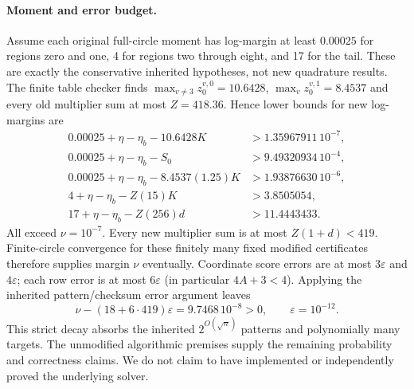 \paragraph{Moment and error budget.}
Assume each original full-circle moment has log-margin at least
$0.00025$ for regions zero and one, 4 for regions two through eight,
and 17 for the tail. These are exactly the conservative inherited
hypotheses, not new quadrature results.
The finite table checker finds
$\max_{v\ne3}z^{v,0}_0=10.6428$,
$\max_v z^{v,1}_0=8.4537$ and every old multiplier sum at most
$Z=418.36$. Hence lower bounds for new log-margins are
\begin{align*}
 0.00025+\eta-\eta_b-10.6428K&>1.35967911\,10^{-7},\\
 0.00025+\eta-\eta_b-S_0&>9.49320934\,10^{-4},\\
 0.00025+\eta-\eta_b-8.4537(1.25)K&>1.93876630\,10^{-6},\\
 4+\eta-\eta_b-Z(15)K&>3.8505054,\\
 17+\eta-\eta_b-Z(256)d&>11.4443433.
\end{align*}
All exceed $\nu=10^{-7}$. Every new multiplier sum is at most
$Z(1+d)<419$. Finite-circle convergence for these finitely many fixed
modified certificates therefore supplies margin $\nu$ eventually.
Coordinate score errors are at most $3\varepsilon$ and $4\varepsilon$;
each row error is at most $6\varepsilon$ (in particular
$4A+3<4$). Applying the inherited pattern/checksum error argument leaves
\[
 \nu-(18+6\cdot419)\varepsilon=9.7468\,10^{-8}>0,
 \qquad \varepsilon=10^{-12}.
\]
This strict decay absorbs the inherited $2^{O(\sqrt n)}$ patterns and
polynomially many targets. The unmodified algorithmic premises supply
the remaining probability and correctness claims. We do not claim to
have implemented or independently proved the underlying solver.

